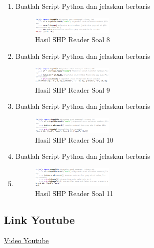 \begin{enumerate}
    \item Buatlah Script Python dan jelaskan berbaris
    
    \hfill\break
    \begin{figure}[H]
		\includegraphics[width=4cm]{figures/1174027/3/soal8.png}
		\centering
		\caption{Hasil SHP Reader Soal 8}
    \end{figure}

    \item Buatlah Script Python dan jelaskan berbaris
    
    \hfill\break
    \begin{figure}[H]
		\includegraphics[width=4cm]{figures/1174027/3/soal9.png}
		\centering
		\caption{Hasil SHP Reader Soal 9}
    \end{figure}

    \item Buatlah Script Python dan jelaskan berbaris
    
    \hfill\break
    \begin{figure}[H]
		\includegraphics[width=4cm]{figures/1174027/3/soal10.png}
		\centering
		\caption{Hasil SHP Reader Soal 10}
    \end{figure}

    \item Buatlah Script Python dan jelaskan berbaris
    \item 
    \hfill\break
    \begin{figure}[H]
		\includegraphics[width=4cm]{figures/1174027/3/soal11.png}
		\centering
		\caption{Hasil SHP Reader Soal 11}
    \end{figure}
\end{enumerate}
\subsection{Link Youtube}
\href{https://youtu.be/DFWrrvXtQTE}{Video Youtube}